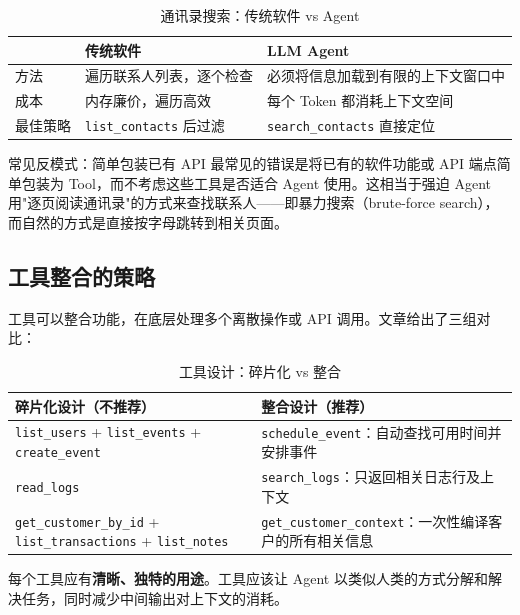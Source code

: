 \documentclass[a4paper]{article}
\begin{document}
\begin{table}[H]
\centering
\caption{通讯录搜索：传统软件 vs Agent}
\begin{tabular}{p{}p{}p{}}
\toprule
 & \textbf{传统软件} & \textbf{LLM Agent} \\
\midrule
方法 & 遍历联系人列表，逐个检查 & 必须将信息加载到有限的上下文窗口中 \\
\midrule
成本 & 内存廉价，遍历高效 & 每个 Token 都消耗上下文空间 \\
\midrule
最佳策略 & \texttt{list\_contacts} 后过滤 & \texttt{search\_contacts} 直接定位 \\
\bottomrule
\end{tabular}
\end{table}

\begin{warningbox}{常见反模式：简单包装已有 API}
最常见的错误是将已有的软件功能或 API 端点简单包装为 Tool，而不考虑这些工具是否适合 Agent 使用。这相当于强迫 Agent 用"逐页阅读通讯录"的方式来查找联系人——即暴力搜索（brute-force search），而自然的方式是直接按字母跳转到相关页面。
\end{warningbox}

\subsection{工具整合的策略}

工具可以整合功能，在底层处理多个离散操作或 API 调用。文章给出了三组对比：

\begin{table}[H]
\centering
\caption{工具设计：碎片化 vs 整合}
\begin{tabular}{p{}p{}}
\toprule
\textbf{碎片化设计（不推荐）} & \textbf{整合设计（推荐）} \\
\midrule
\texttt{list\_users} + \texttt{list\_events} + \texttt{create\_event} & \texttt{schedule\_event}：自动查找可用时间并安排事件 \\
\midrule
\texttt{read\_logs} & \texttt{search\_logs}：只返回相关日志行及上下文 \\
\midrule
\texttt{get\_customer\_by\_id} + \texttt{list\_transactions} + \texttt{list\_notes} & \texttt{get\_customer\_context}：一次性编译客户的所有相关信息 \\
\bottomrule
\end{tabular}
\end{table}

每个工具应有\textbf{清晰、独特的用途}。工具应该让 Agent 以类似人类的方式分解和解决任务，同时减少中间输出对上下文的消耗。
\end{document}
